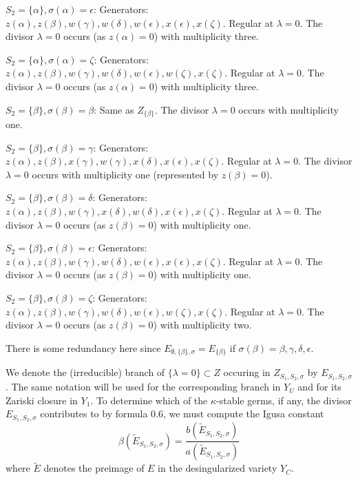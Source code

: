 \documentclass[12pt,letterpaper]{amsart}
\begin{document}
\noindent
$S_2=\{\alpha\}, \sigma(\alpha)=\epsilon$: Generators: $z(\alpha), z(\beta),
w(\gamma), w(\delta),w(\epsilon),x(\epsilon),x(\zeta)$.
Regular at $\lambda =0$. The divisor $\lambda =0$
occurs (as $z(\alpha)=0$) with multiplicity three.

\noindent
$S_2=\{\alpha\}, \sigma(\alpha)=\zeta$: Generators: $z(\alpha), z(\beta),
w(\gamma), w(\delta),w(\epsilon), w(\zeta),
x(\zeta)$. Regular at $\lambda =0$. The divisor $\lambda =0$
occurs (as $z(\alpha)=0$) with multiplicity three.

\noindent
$S_2=\{\beta\}, \sigma(\beta)=\beta$: Same as $Z_{\{\beta\}}$.
The divisor $\lambda =0$
occurs with multiplicity one.

\noindent
$S_2=\{\beta\}, \sigma(\beta)=\gamma$: Generators: $z(\alpha), z(\beta),
x(\gamma), w(\gamma), x(\delta), x(\epsilon),
x(\zeta)$. Regular at $\lambda =0$. The divisor $\lambda =0$
occurs with multiplicity one (represented by $z(\beta)=0$).

\noindent
$S_2=\{\beta\}, \sigma(\beta)=\delta$: Generators: $z(\alpha), z(\beta),
w(\gamma), x(\delta),w(\delta), x(\epsilon),
x(\zeta)$. Regular at $\lambda =0$. The divisor $\lambda =0$
occurs (as $z(\beta)=0$) with multiplicity one.

\noindent
$S_2=\{\beta\}, \sigma(\beta)=\epsilon$: Generators: $z(\alpha), z(\beta),
w(\gamma), w(\delta),w(\epsilon),x(\epsilon),x(\zeta)$.
Regular at $\lambda =0$. The divisor $\lambda =0$
occurs (as $z(\beta)=0$) with multiplicity one.

\noindent
$S_2=\{\beta\}, \sigma(\beta)=\zeta$: Generators: $z(\alpha), z(\beta),
w(\gamma), w(\delta),w(\epsilon), w(\zeta),
x(\zeta)$. Regular at $\lambda =0$. The divisor $\lambda =0$
occurs (as $z(\beta)=0$) with multiplicity two.

There is some redundancy here since $E_{\emptyset,\{\beta\},\sigma}=
E_{\{\beta\}}$ if $\sigma(\beta)=\beta,\gamma,\delta,\epsilon$.

We denote the (irreducible) branch of $\{\lambda =0\}\subset Z$
occuring in $Z_{S_1,S_2,\sigma}$ by $E_{S_1,S_2,\sigma}$. The same notation
will be used for the corresponding branch in $Y_U$ and for its Zariski closure
in $Y_1$. To determine which of the $\kappa$-stable germs, if any,
the divisor $E_{S_1,S_2,\sigma}$
contributes to by formula 0.6,
we must compute the Igusa constant
\[
\beta(\tilde{E}_{S_1,S_2,\sigma})=
\frac{b(\tilde{E}_{S_1,S_2,\sigma})}{a(\tilde{E}_{S_1,S_2,\sigma})}
\tag{4.2}
\]
where $\tilde{E}$ denotes the preimage of $E$ in the
desingularized variety $Y_C$.
\end{document}
